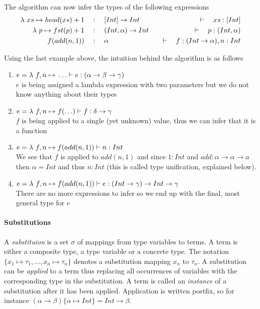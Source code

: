 The algorithm can now infer the types of the following expressions
\begin{align*}
  \lambda{} \ xs \mapsto{} head(xs) + 1 & \quad:\quad [Int] \to Int         & \quad\vdash\quad xs : [Int]                  \\
  \lambda{} \ p \mapsto{} fst(p) + 1    & \quad:\quad (Int, \alpha) \to Int & \quad\vdash\quad p : (Int, \alpha)           \\
  f(add(n, 1))          & \quad:\quad \alpha                & \quad\vdash\quad f: (Int \to \alpha), n: Int \\
\end{align*}

Using the last example above, the intuition behind the algorithm is as follows
\begin{enumerate}
\item $e = \lambda{} \ f, n \mapsto{} \ldots \vdash e: (\alpha \to \beta \to \gamma)$ \\
  $e$ is being assigned a lambda expression with two parameters but we do not know anything about their types
\item $e = \lambda{} \ f, n \mapsto{} f(\ldots) \vdash f: \delta \to \gamma$ \\
  $f$ is being applied to a single (yet unknown) value, thus we can infer that it is a function
\item $e = \lambda{} \ f, n \mapsto{} f(add(n, 1)) \vdash n : Int$ \\
  We see that $f$ is applied to $add(n, 1)$ and since $1: Int$ and $add:\alpha \to \alpha \to a$ then $\alpha = Int$ and thus $n:Int$ (this is called type unification, explained below).
\item $e = \lambda{} \ f, n \mapsto{} f(add(n, 1)) \vdash e : (Int \to \gamma) \to Int \to \gamma$ \\
  There are no more expressions to infer so we end up with the final, most general type for $e$
\end{enumerate}

\paragraph{Substitutions}
A \emph{substituion} is a set $\sigma$ of mappings from type variables to terms. A term is either a composite type, a type variable or a concrete type. The notation $\{ x_1 \mapsto \tau_1, \ldots, x_n \mapsto \tau_n \}$ denotes a substitution mapping $x_n$ to $\tau_n$. A substitution can be \emph{applied} to a term thus replacing all occurrences of variables with the corresponding type in the substitution. A term is called an \emph{instance} of a substitution after it has been applied\cite[sec. 1]{wiki-unif14}. Application is written postfix, so for instance $(\alpha \to \beta) \{\alpha \mapsto Int\} = Int \to \beta$.

